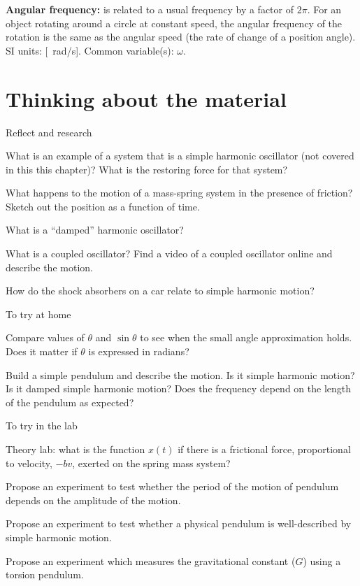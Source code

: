 \begin{definitions}
\item \textbf{Angular frequency:} is related to a usual frequency by a factor of $2\pi$. For an object rotating around a circle at constant speed, the angular frequency of the rotation is the same as the angular speed (the rate of change of a position angle). SI units: [\SI{}{rad/s}]. Common variable(s): $\omega$.
\end{definitions}

\newpage
\section{Thinking about the material}

\begin{chapteractivity}{Reflect and research}
{
\item What is an example of a system that is a simple harmonic oscillator (not covered in this this chapter)? What is the restoring force for that system?
\item What happens to the motion of a mass-spring system in the presence of friction? Sketch out the position as a function of time.
\item What is a ``damped'' harmonic oscillator?
\item What is a coupled oscillator? Find a video of a coupled oscillator online and describe the motion.
\item How do the shock absorbers on a car relate to simple harmonic motion?
}
\end{chapteractivity}


\begin{chapteractivity}{To try at home}
{
\item Compare values of $\theta$ and $\sin\theta$ to see when the small angle approximation holds. Does it matter if $\theta$ is expressed in radians?
\item Build a simple pendulum and describe the motion. Is it simple harmonic motion? Is it damped simple harmonic motion? Does the frequency depend on the length of the pendulum as expected?
}
\end{chapteractivity}

\begin{chapteractivity}{To try in the lab}
{
\item Theory lab: what is the function $x(t)$ if there is a frictional force, proportional to velocity, $-bv$, exerted on the spring mass system?
\item Propose an experiment to test whether the period of the motion of pendulum depends on the amplitude of the motion.
\item Propose an experiment to test whether a physical pendulum is well-described by simple harmonic motion.
}
\item Propose an experiment which measures the gravitational constant ($G$) using a torsion pendulum.
\end{chapteractivity}





